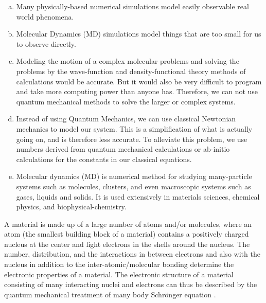 \begin{enumerate}[(a)]
\item Many physically-based numerical simulations model easily observable real world phenomena.
 
\item Molecular Dynamics (MD) simulations model things that are too small for us to observe directly.
\item Modeling the motion of a complex molecular problems and solving the problems by  the 
wave-function and density-functional theory methods of calculations would be accurate. But it would also be very difficult to program and take more computing power than anyone has.  Therefore, we can not use quantum mechanical methods to solve the larger or complex systems. 
\item Instead of using Quantum Mechanics, we can use classical Newtonian mechanics to model our system.
This is a simplification of what is actually going on, and is therefore less accurate. To alleviate this problem, we use numbers derived from quantum mechanical calculations or ab-initio calculations for the constants in our classical equations.
\item  Molecular dynamics (MD) is 
numerical method for studying many-particle systems such as molecules, clusters, and even macroscopic systems such as gases, liquids and solids. It is 
used extensively in materials sciences, chemical physics, and biophysical-chemistry.
\end{enumerate}

A material is made up of a large number of atoms and/or molecules, where an atom (the smallest building block of a material) contains a positively charged nucleus at the center and light electrons in the shells around the nucleus. The number, distribution, and the interactions in between electrons and also with the nucleus in addition to the inter-atomic/molecular bonding determine the electronic properties of a material. The electronic structure of a material consisting of many interacting nuclei and electrons can thus be described by the quantum mechanical treatment of many body Schr\"onger equation \citep{Martin2004}. 

